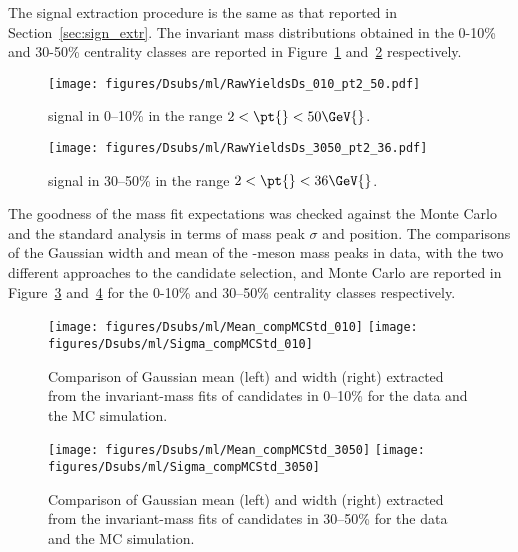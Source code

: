 The signal extraction procedure is the same as that reported in Section~\ref{sec:sign_extr}. 
The invariant mass distributions obtained in the 0-10\% and 30-50\% centrality classes are reported in Figure~\ref{fig:sig_ml_010} and~\ref{fig:sig_ml_3050} respectively. \\
\begin{figure}[htpb]
  \begin{center}
   \texttt{[image: figures/Dsubs/ml/RawYieldsDs\_010\_pt2\_50.pdf]}
   \caption{\Dsubs{} signal in 0--10\% in the range \(2 < \pt{} < 50 \GeV{}\).}
  \label{fig:sig_ml_010}
  \end{center}
\end{figure}
\begin{figure}[htpb]
  \begin{center}
   \texttt{[image: figures/Dsubs/ml/RawYieldsDs\_3050\_pt2\_36.pdf]}
   \caption{\Dsubs{} signal in 30--50\% in the range \(2 < \pt{} < 36 \GeV{}\).}
  \label{fig:sig_ml_3050}
  \end{center}
\end{figure}
The goodness of the mass fit expectations was checked against the Monte Carlo and the standard analysis in terms of mass peak \(\sigma\) and position. 
The comparisons of the Gaussian width and mean of the \Dsubs{}-meson mass peaks in data, with the two different approaches to the candidate selection, 
and Monte Carlo are reported in Figure~\ref{fig:comp_par_010} and~\ref{fig:comp_par_3050} for the 0-10\% and 30–50\% centrality classes respectively. \\
\begin{figure}[htpb]
  \begin{center}
    \texttt{[image: figures/Dsubs/ml/Mean\_compMCStd\_010]}
    \texttt{[image: figures/Dsubs/ml/Sigma\_compMCStd\_010]}
   \caption{Comparison of Gaussian mean (left) and width (right) extracted from the invariant-mass fits of \Dsubs{} candidates in 0--10\% for the data and the MC simulation.}
  \label{fig:comp_par_010}
  \end{center}
\end{figure}
\begin{figure}[htpb]
  \begin{center}
    \texttt{[image: figures/Dsubs/ml/Mean\_compMCStd\_3050]}
    \texttt{[image: figures/Dsubs/ml/Sigma\_compMCStd\_3050]}
   \caption{Comparison of Gaussian mean (left) and width (right) extracted from the invariant-mass fits of \Dsubs{} candidates in 30--50\% for the data and the MC simulation.}
  \label{fig:comp_par_3050}
  \end{center}
\end{figure}
